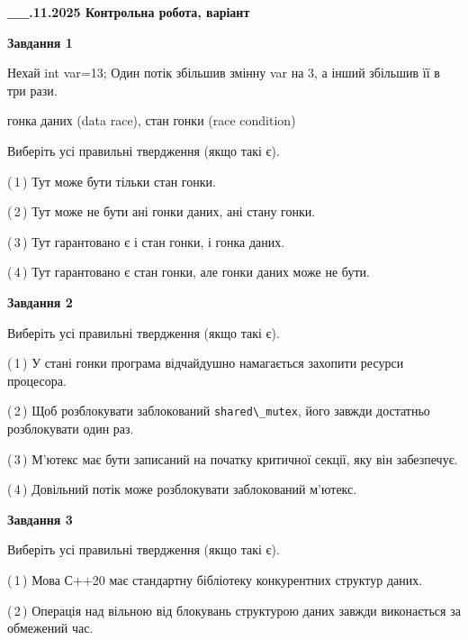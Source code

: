 \documentclass[12pt, ukrainian]{article}
\def\code#1{\Verb!#1!}
\begin{document}
\begin {large}

\textbf{\_\_.11.2025 Контрольна робота, варіант  }\par


{

\begin{center}
\textbf{Завдання 1}
\end{center}
Нехай int var=13; Один потік збільшив змінну var на 3, а інший збільшив її в три рази.

гонка даних (data race), стан гонки (race condition)

Виберіть усі правильні твердження (якщо такі є).\par
\vspace{2mm}
(\,1\,) Тут може бути тільки стан гонки.%

(\,2\,) Тут може не бути ані гонки даних, ані стану гонки.%

(\,3\,) Тут гарантовано є і стан гонки, і гонка даних.%

(\,4\,) Тут гарантовано є стан гонки, але гонки даних може не бути.%



\begin{center}
\textbf{Завдання 2}
\end{center}
Виберіть усі правильні твердження (якщо такі є).\par
\vspace{2mm}

(\,1\,) У стані гонки програма відчайдушно намагається захопити ресурси процесора.%

(\,2\,) Щоб розблокувати заблокований \code{shared\_mutex}, його завжди достатньо розблокувати один раз.%

(\,3\,) М’ютекс має бути записаний на початку критичної секції, яку він забезпечує.%

(\,4\,) Довільний потік може розблокувати заблокований м’ютекс.%



\begin{center}
\textbf{Завдання 3}
\end{center}
Виберіть усі правильні твердження (якщо такі є).\par
\vspace{2mm}

(\,1\,) Мова С++20 має стандартну бібліотеку конкурентних структур даних.%

(\,2\,) Операція над вільною від блокувань структурою даних завжди виконається за обмежений час.%

}
\end{large}
\end{document}
